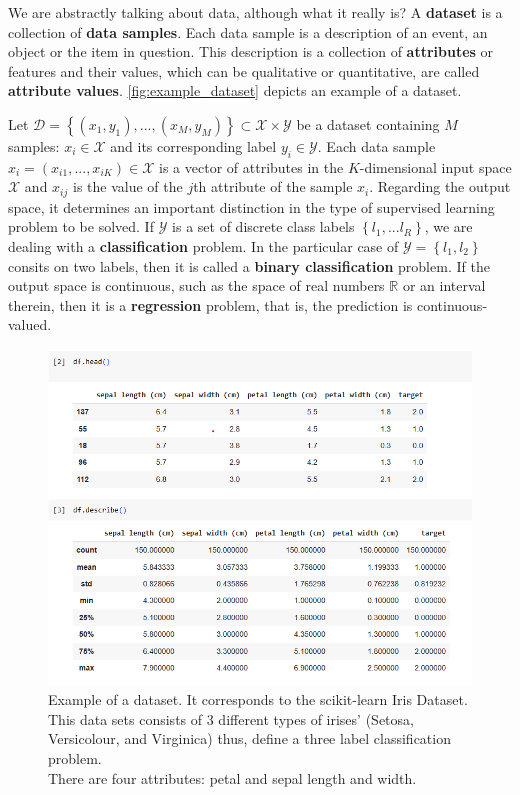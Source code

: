 We are abstractly talking about data, although what it really is? A \textbf{dataset} is a collection of \textbf{data samples}. Each data sample is a description of an event, an object or the item in question. This description is a collection of \textbf{attributes} or features and their values, which can be qualitative or quantitative, are called \textbf{attribute values}. \autoref{fig:example_dataset} depicts an example of a dataset.

Let ${\mathcal{D} = \left\lbrace (x_1,y_1),...,(x_M,y_M)\right\rbrace \subset \mathcal{X} \times \mathcal{Y}}$ be a dataset containing $M$ samples: $x_i \in \mathcal{X}$ and its corresponding label $y_i \in \mathcal{Y}$. Each data sample $x_i = (x_{i1},..., x_{iK}) \in \mathcal{X}$ is a vector of attributes in the $K$-dimensional input space $\mathcal{X}$ and $x_{ij}$ is the value of the $j$th attribute of the sample $x_i$. Regarding the output space, it determines an important distinction in the type of supervised learning problem to be solved. If $\mathcal{Y}$  is a set of discrete class labels $\left \lbrace l_1, ... l_R \right\rbrace$, we are dealing with a \textbf{classification} problem. In the particular case of $\mathcal{Y} = \left\lbrace l_1, l_2 \right\rbrace$ consits on two labels, then it is called a \textbf{binary classification} problem. If the output space is continuous, such as the space of real numbers $\mathbb{R}$ or an interval therein, then it is a \textbf{regression} problem, that is, the prediction is continuous-valued.

\begin{figure}
    \centering
    \includegraphics[width=0.8\linewidth]{img/img-ch1/iris_dataset.png}
    \caption{Example of a dataset. It corresponds to the scikit-learn Iris Dataset.\\ This data sets consists of 3 different types of irises’ (Setosa, Versicolour, and Virginica) thus, define a three label classification problem. \\
    There are four attributes: petal and sepal length and width.}
    \label{fig:example_dataset}
\end{figure}


